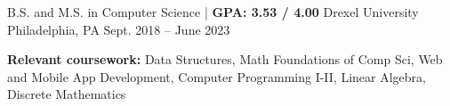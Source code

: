 

\begin{cventries}

  \cventry
  {B.S. and M.S. in Computer Science | \textbf{ GPA: 3.53 / 4.00}} %
  {Drexel University} %
  {Philadelphia, PA} %
  {Sept. 2018 -- June 2023} %
  {
    \begin{cvitems} %
      \item {\color{darktext} \textbf{Relevant coursework:}}
      Data Structures,
      Math Foundations of Comp Sci,
      Web and Mobile App Development,
      Computer Programming I-II,
      Linear Algebra,
      Discrete Mathematics
    \end{cvitems}
  }

\end{cventries}
